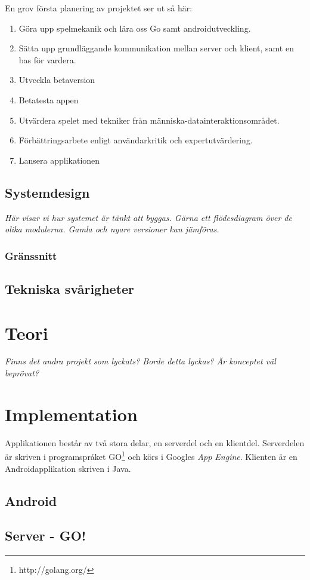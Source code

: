 \documentclass[12pt,a4paper]{article}
\begin{document}
En grov första planering av projektet ser ut så här:
\begin{enumerate}
\item Göra upp spelmekanik och lära oss Go samt androidutveckling.
\item Sätta upp grundläggande kommunikation mellan server och klient, samt en bas för vardera.
\item Utveckla betaversion
\item Betatesta appen
\item Utvärdera spelet med tekniker från människa-datainteraktionsområdet.
\item Förbättringsarbete enligt användarkritik och expertutvärdering.
\item Lansera applikationen
\end{enumerate}
\subsection{Systemdesign}
\textit{Här visar vi hur systemet är tänkt att byggas. Gärna ett flödesdiagram över de olika modulerna. Gamla och nyare versioner kan jämföras.}
\subsubsection{Gränssnitt}

\subsection{Tekniska svårigheter}

\section{Teori}
\textit{Finns det andra projekt som lyckats? Borde detta lyckas? Är konceptet väl beprövat?}
\section{Implementation}
Applikationen består av två stora delar, en serverdel och en klientdel. Serverdelen är skriven i programspråket GO\footnote{http://golang.org/} och körs i Googles \textit{App Engine}. Klienten är en Androidapplikation skriven i Java.
\subsection{Android}
\subsection{Server - GO!}
\end{document}
